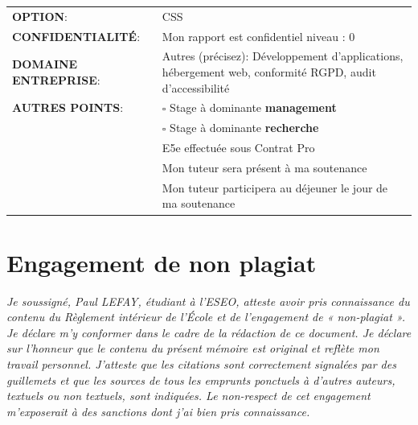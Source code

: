 \documentclass[12pt, a4paper, twoside]{article}
\begin{document}
\begin{center}
	\begin{tabular}{ m{5cm} m{11.5cm} }
	\textbf{OPTION}: &  \mbox{\ooalign{$\checkmark$\cr\hidewidth$\square$\hidewidth\cr}} CSS  \\
    \textbf{CONFIDENTIALITÉ}:  & Mon rapport est confidentiel niveau : \mbox{\ooalign{$\checkmark$\cr\hidewidth$\square$\hidewidth\cr}} 0 \\
    \textbf{DOMAINE ENTREPRISE}: & \mbox{\ooalign{$\checkmark$\cr\hidewidth$\square$\hidewidth\cr}} Autres (précisez): Développement d'applications, hébergement web, conformité RGPD, audit d'accessibilité \\
    \textbf{AUTRES POINTS}: &  $\square$ Stage à dominante \textbf{management} \\
                             &  $\square$ Stage à dominante \textbf{recherche} \\
                             & \mbox{\ooalign{$\checkmark$\cr\hidewidth$\square$\hidewidth\cr}} E5e effectuée sous Contrat Pro \\
                             &  \mbox{\ooalign{$\checkmark$\cr\hidewidth$\square$\hidewidth\cr}} Mon tuteur sera présent à ma soutenance \\
                             &  \mbox{\ooalign{$\checkmark$\cr\hidewidth$\square$\hidewidth\cr}} Mon tuteur participera au déjeuner le jour de ma soutenance \\
\end{tabular}
\end{center}

\newpage

\section*{Engagement de non plagiat}
\textit{Je soussigné, Paul LEFAY, étudiant à l'\gls{ESEO}, atteste avoir pris connaissance du contenu du Règlement intérieur de l'École et de l'engagement de « non-plagiat ». 
Je déclare m'y conformer dans le cadre de la rédaction de ce document. 
Je déclare sur l'honneur que le contenu du présent mémoire est original et reflète mon travail personnel. 
J'atteste que les citations sont correctement signalées par des guillemets et que les sources de tous les emprunts ponctuels à d'autres auteurs, textuels ou non textuels, sont indiquées. 
Le non-respect de cet engagement m'exposerait à des sanctions dont j'ai bien pris connaissance.}
\end{document}

